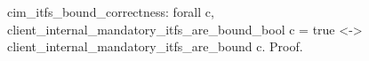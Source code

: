 cim_itfs_bound_correctness:
  forall c,
    client_internal_mandatory_itfs_are_bound_bool c = true <-> 
    client_internal_mandatory_itfs_are_bound c.
Proof.